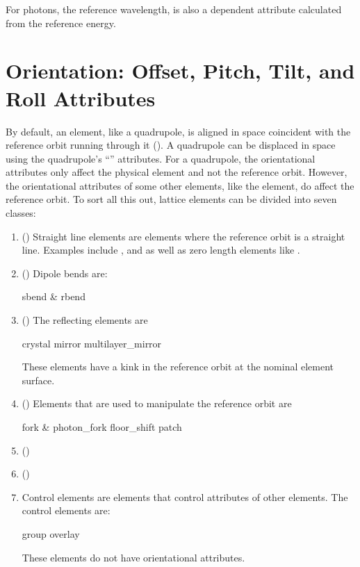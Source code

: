 For photons, the reference wavelength,  is also a dependent attribute calculated
from the reference energy.

\vfill

\section{Orientation: Offset, Pitch, Tilt, and Roll Attributes}
\label{s:offset}

By default, an element, like a quadrupole, is aligned in space coincident with the reference orbit
running through it (). A quadrupole can be displaced in space using the
quadrupole's ``'' attributes. For a quadrupole, the orientational attributes only
affect the physical element and not the reference orbit. However, the orientational attributes of
some other elements, like the  element, do affect the reference orbit. To sort all this
out, lattice elements can be divided into seven classes:
  \begin{enumerate}
  \item{} () \Newline
Straight line elements are elements where the reference orbit is a straight line. Examples include
, and  as well as zero length elements like .
  \item{} () \Newline
Dipole bends are:
\begin{example}
  sbend \& rbend
\end{example}
  \item{} () \Newline
The reflecting elements are
\begin{example}
  crystal
  mirror
  multilayer_mirror
\end{example}
These elements have a kink in the reference orbit at the nominal
element surface.
  \item{} () \Newline
Elements that are used to manipulate the reference orbit are
\begin{example}
  fork \& photon_fork
  floor_shift
  patch
\end{example}
  \item{} () \Newline
  \item{} () \Newline
  \item{} \Newline
Control elements are elements that control attributes of other
elements. The control elements are:
\begin{example}
  group
  overlay
\end{example}
These elements do not have orientational attributes.
  \end{enumerate}

